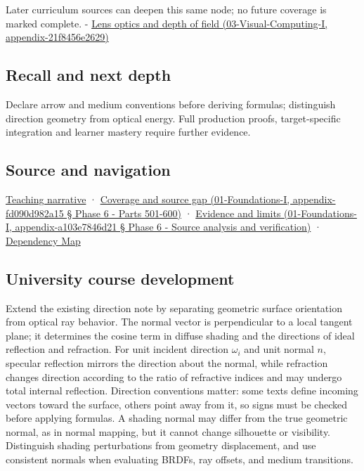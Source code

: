 Later curriculum sources can deepen this same node; no future coverage is marked complete. - \href{}{Lens optics and depth of field (03-Visual-Computing-I, appendix-21f8456e2629)}

\subsection{Recall and next depth}\label{recall-and-next-depth}

Declare arrow and medium conventions before deriving formulas; distinguish direction geometry from optical energy. Full production proofs, target-specific integration and learner mastery require further evidence.

\subsection{Source and navigation}\label{source-and-navigation}

\href{Continuous\%20Notes/Computing\%20Foundations\%20-\%20From\%20Bits\%20to\%20C++\%20and\%20Systems\%20APIs\#Light\%20uses\%20the\%20same\%20decomposition\%20in\%20a\%20new\%20role}{Teaching narrative} · \href{}{Coverage and source gap (01-Foundations-I, appendix-fd090d982a15 § Phase 6 - Parts 501-600)} · \href{}{Evidence and limits (01-Foundations-I, appendix-a103e7846d21 § Phase 6 - Source analysis and verification)} · \hyperref[appendix-4ad47bdd269a]{Dependency Map}

\subsection{University course development}\label{university-course-development}

Extend the existing direction note by separating geometric surface orientation from optical ray behavior. The normal vector is perpendicular to a local tangent plane; it determines the cosine term in diffuse shading and the directions of ideal reflection and refraction. For unit incident direction \(\omega_i\) and unit normal \(n\), specular reflection mirrors the direction about the normal, while refraction changes direction according to the ratio of refractive indices and may undergo total internal reflection. Direction conventions matter: some texts define incoming vectors toward the surface, others point away from it, so signs must be checked before applying formulas. A shading normal may differ from the true geometric normal, as in normal mapping, but it cannot change silhouette or visibility. Distinguish shading perturbations from geometry displacement, and use consistent normals when evaluating BRDFs, ray offsets, and medium transitions.


